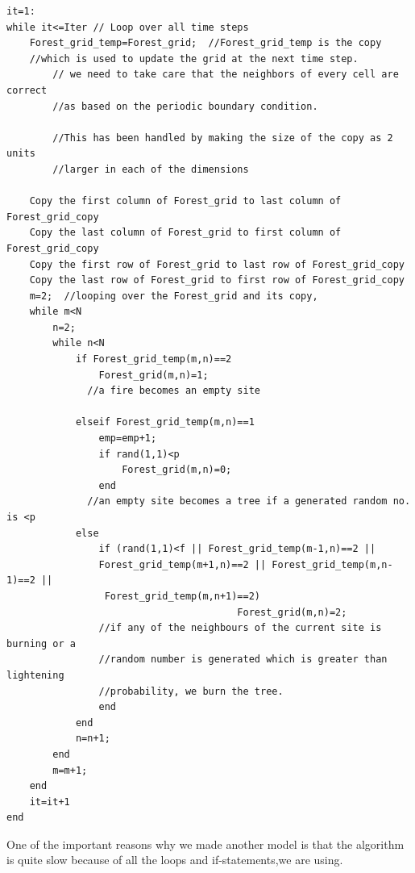\documentclass[11pt]{article}
\begin{document}
\begin{verbatim}
it=1:
while it<=Iter // Loop over all time steps
    Forest_grid_temp=Forest_grid;  //Forest_grid_temp is the copy
    //which is used to update the grid at the next time step.
		// we need to take care that the neighbors of every cell are correct 
		//as based on the periodic boundary condition. 

		//This has been handled by making the size of the copy as 2 units 
		//larger in each of the dimensions    
		
    Copy the first column of Forest_grid to last column of Forest_grid_copy
    Copy the last column of Forest_grid to first column of Forest_grid_copy
    Copy the first row of Forest_grid to last row of Forest_grid_copy
    Copy the last row of Forest_grid to first row of Forest_grid_copy
    m=2;  //looping over the Forest_grid and its copy, 
    while m<N
        n=2;
        while n<N
            if Forest_grid_temp(m,n)==2
                Forest_grid(m,n)=1;
              //a fire becomes an empty site  
              
            elseif Forest_grid_temp(m,n)==1
                emp=emp+1;
                if rand(1,1)<p
                    Forest_grid(m,n)=0;
                end
              //an empty site becomes a tree if a generated random no. is <p
            else
                if (rand(1,1)<f || Forest_grid_temp(m-1,n)==2 || 
                Forest_grid_temp(m+1,n)==2 || Forest_grid_temp(m,n-1)==2 ||
                 Forest_grid_temp(m,n+1)==2)
                					    Forest_grid(m,n)=2;
                //if any of the neighbours of the current site is burning or a
                //random number is generated which is greater than lightening 
                //probability, we burn the tree.
                end
            end
            n=n+1;
        end
        m=m+1;
    end
    it=it+1
end
\end{verbatim}
One of the important reasons why we made another model is that the algorithm is quite slow because of all the loops and if-statements,we are using.
\end{document}
